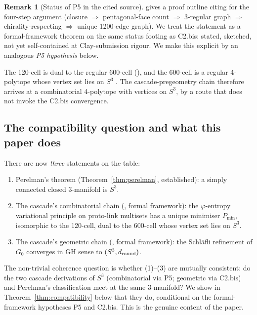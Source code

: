 \documentclass[11pt, a4paper]{amsart}
\theoremstyle{definition}
\newtheorem{remark}[theorem]{Remark}
\begin{document}
\begin{remark}[Status of P5 in the cited source]
\label{rmk:p5-status}
\cite[\S P5.2]{CascadePregeometry} gives a proof outline citing
\cite[\S B.5]{VFDMasterMath} for the four-step argument
(closure $\Rightarrow$ pentagonal-face count $\Rightarrow$ 3-regular
graph $\Rightarrow$ chirality-respecting $\Rightarrow$ unique
1200-edge graph). We treat the statement as a formal-framework
theorem on the same status footing as C2.bis: stated, sketched,
not yet self-contained at Clay-submission rigour. We make this
explicit by an analogous \emph{P5 hypothesis} below.
\end{remark}

The 120-cell is dual to the regular 600-cell
(\cite[\S P5.3]{CascadePregeometry}), and the 600-cell is a regular
4-polytope whose vertex set lies on $S^{3}$
\cite[\S 8.7]{CoxeterRegularPolytopes}. The cascade-pregeometry
chain therefore arrives at a combinatorial 4-polytope with vertices
on $S^{3}$, by a route that does not invoke the C2.bis convergence.

\subsection{The compatibility question and what this paper does}

There are now \emph{three} statements on the table:
\begin{enumerate}
\item Perelman's theorem (Theorem~\ref{thm:perelman}, established):
  a simply connected closed $3$-manifold is $S^{3}$.
\item The cascade's combinatorial chain
  (\cite[\S\S P3--P5]{CascadePregeometry}, formal framework):
  the $\varphi$-entropy variational principle on proto-link
  multisets has a unique minimiser $P_{\min}$, isomorphic to the
  120-cell, dual to the 600-cell whose vertex set lies on $S^{3}$.
\item The cascade's geometric chain
  (\cite[\S C2.bis]{CascadeGR}, formal framework): the Schl\"{a}fli
  refinement of $G_{0}$ converges in GH sense to $(S^{3},
  d_{\rm round})$.
\end{enumerate}

The non-trivial coherence question is whether (1)--(3) are mutually
consistent: do the two cascade derivations of $S^{3}$ (combinatorial
via P5; geometric via C2.bis) and Perelman's classification meet at
the same $3$-manifold? We show in Theorem~\ref{thm:compatibility}
below that they do, conditional on the formal-framework hypotheses
P5 and C2.bis. This is the genuine content of the paper.
\end{document}
